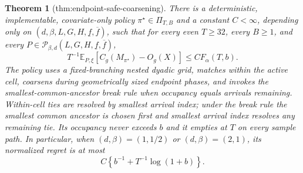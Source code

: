 \documentclass{article}
\newtheorem{theorem}{Theorem}
\begin{document}
\begin{theorem}[thm:endpoint-safe-coarsening]\label{thm:endpoint-safe-coarsening}
There is a deterministic, implementable, covariate-only policy \(\pi^\star\in\Pi_{T,B}\) and a constant \(C<\infty\), depending only on \((d,\beta,L,G,H,\underline f,\overline f)\), such that for every even \(T\ge32\), every \(B\ge1\), and every \(P\in\mathcal P_{\beta,d}(L,G,H,\underline f,\overline f)\),
\[
 T^{-1}\mathbb E_{P,\xi}\!\left[C_g(M_{\pi^\star})-O_g(X)\right]
 \le C F_\alpha(T,b).
\]
The policy uses a fixed-branching nested dyadic grid, matches within the active cell, coarsens during geometrically sized endpoint phases, and invokes the smallest-common-ancestor break rule when occupancy equals arrivals remaining.  Within-cell ties are resolved by smallest arrival index; under the break rule the smallest common ancestor is chosen first and smallest arrival index resolves any remaining tie.  Its occupancy never exceeds \(b\) and it empties at \(T\) on every sample path.  In particular, when \((d,\beta)=(1,1/2)\) or \((d,\beta)=(2,1)\), its normalized regret is at most
\[
 C\left\{b^{-1}+T^{-1}\log(1+b)\right\}.
\]
\end{theorem}
\end{document}
